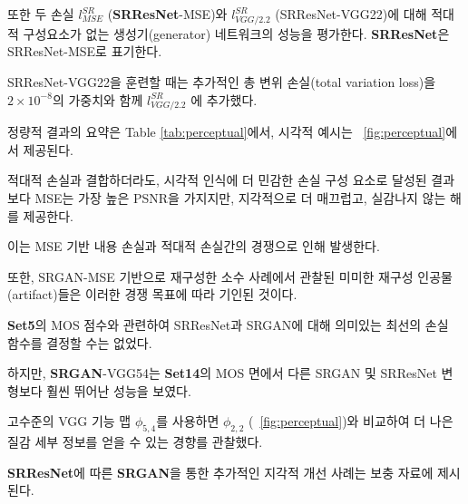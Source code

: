 \documentclass[10pt,twocolumn,letterpaper]{article}
\newcommand{\kor}[1]{#1}
\newcommand{\eng}[1]{}
\begin{document}
\eng{
We also evaluate the performance of the generator network without adversarial component for the two losses $l^{SR}_{MSE}$ (\textbf{SRResNet}-MSE) and $l^{SR}_{VGG/2.2}$ (SRResNet-VGG22). We refer to SRResNet-MSE as \textbf{SRResNet}.
}\kor{
또한 두 손실 $l^{SR}_{MSE}$ (\textbf{SRResNet}-MSE)와 $l^{SR}_{VGG/2.2}$ (SRResNet-VGG22)에 대해 적대적 구성요소가 없는 생성기(generator) 네트워크의 성능을 평가한다. \textbf{SRResNet}은 SRResNet-MSE로 표기한다.
}
\eng{
Note, when training SRResNet-VGG22 we added an additional total variation loss with weight $2\times10^{-8}$ to $l^{SR}_{VGG/2.2}$ \cite{Aly2005,Johnson16PercepLoss}.
}\kor{
SRResNet-VGG22을 훈련할 때는 추가적인 총 변위 손실(total variation loss)을 $2\times10^{-8}$의 가중치와 함께 $l^{SR}_{VGG/2.2}$ \cite{Aly2005,Johnson16PercepLoss}에 추가했다.
}
\eng{
Quantitative results are summarized in Table \ref{tab:perceptual} and visual examples provided in \figurename~\ref{fig:perceptual}.
}\kor{
정량적 결과의 요약은 Table \ref{tab:perceptual}에서, 시각적 예시는 \figurename~\ref{fig:perceptual}에서 제공된다.
}
\eng{
Even combined with the adversarial loss, \ac{MSE} provides solutions with the highest \ac{PSNR} values that are, however, perceptually rather smooth and less convincing than results achieved with a loss component more sensitive to visual perception.
}\kor{
적대적 손실과 결합하더라도, 시각적 인식에 더 민감한 손실 구성 요소로 달성된 결과보다 \ac{MSE}는 가장 높은 \ac{PSNR}을 가지지만, 지각적으로 더 매끄럽고, 실감나지 않는 해를 제공한다.
} \eng{
This is caused by competition between the \ac{MSE}-based content loss and the adversarial loss.
}\kor{
이는 \ac{MSE} 기반 내용 손실과 적대적 손실간의 경쟁으로 인해 발생한다.
} \eng{
We further attribute minor reconstruction artifacts, which we observed in a minority of SRGAN-MSE-based reconstructions, to those competing objectives.
}\kor{
또한, SRGAN-MSE 기반으로 재구성한 소수 사례에서 관찰된 미미한 재구성 인공물(artifact)들은 이러한 경쟁 목표에 따라 기인된 것이다.
} \eng{
We could not determine a significantly best loss function for SRResNet or SRGAN with respect to \ac{MOS} score on \textbf{Set5}.
}\kor{
\textbf{Set5}의 \ac{MOS} 점수와 관련하여 SRResNet과 SRGAN에 대해 의미있는 최선의 손실 함수를 결정할 수는 없었다.
} \eng{
However, \textbf{SRGAN}-VGG54 significantly outperformed other SRGAN and SRResNet variants on \textbf{Set14} in terms of \ac{MOS}.
}\kor{
하지만, \textbf{SRGAN}-VGG54는 \textbf{Set14}의 \ac{MOS} 면에서 다른 SRGAN 및 SRResNet 변형보다 훨씬 뛰어난 성능을 보였다.
}
\eng{
We observed a trend that using the higher level VGG feature maps $\phi_{5,4}$ yields better texture detail when compared to $\phi_{2,2}$ (\cf \figurename~\ref{fig:perceptual}).
}\kor{
고수준의 VGG 기능 맵 $\phi_{5,4}$를 사용하면 $\phi_{2,2}$ (\cf \figurename~\ref{fig:perceptual})와 비교하여 더 나은 질감 세부 정보를 얻을 수 있는 경향를 관찰했다.
}
\eng{
Further examples of perceptual improvements through \textbf{SRGAN} over \textbf{SRResNet} are provided in the supplementary material.
}\kor{
\textbf{SRResNet}에 따른 \textbf{SRGAN}을 통한 추가적인 지각적 개선 사례는 보충 자료에 제시된다.
}
\end{document}
